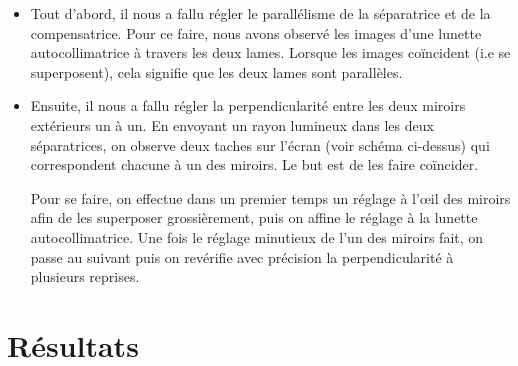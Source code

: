 \documentclass[12pt,a4paper]{article}
\begin{document}
	\begin{itemize}[label=$\circ$]
		\item 
		Tout d'abord, il nous a fallu régler le parallélisme de la séparatrice et de la compensatrice. Pour ce faire, nous avons observé les images d'une lunette autocollimatrice à travers les deux lames. Lorsque les images coïncident (i.e se superposent), cela signifie que les deux lames sont parallèles. 
		
		\item 
		Ensuite, il nous a fallu régler la perpendicularité entre les deux miroirs extérieurs un à un. En envoyant un rayon lumineux dans les deux séparatrices, on observe deux taches sur l'écran (voir schéma ci-dessus) qui correspondent chacune à un des miroirs. Le but est de les faire coïncider. 
		
		Pour se faire, on effectue dans un premier temps un réglage à l'œil des miroirs afin de les superposer grossièrement, puis on affine le réglage à la lunette autocollimatrice. Une fois le réglage minutieux de l'un des miroirs fait, on passe au suivant puis on revérifie avec précision la perpendicularité à plusieurs reprises.
	\end{itemize}
	\section{Résultats}
	
\end{document}
